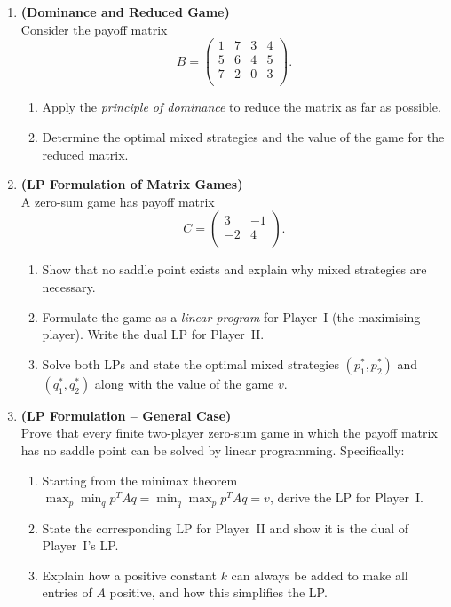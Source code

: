 \documentclass[12pt,a4paper]{article}
\begin{document}
\begin{enumerate}[leftmargin=*, label=\textbf{Q.\arabic*.}]
\item \textbf{(Dominance and Reduced Game)}\\
  Consider the payoff matrix
  \[
    B = \begin{pmatrix}
          1 & 7 & 3 & 4 \\
          5 & 6 & 4 & 5 \\
          7 & 2 & 0 & 3 \\
        \end{pmatrix}.
  \]
  \begin{enumerate}[label=(\alph*)]
    \item Apply the \textit{principle of dominance} to reduce the matrix as far
          as possible.
    \item Determine the optimal mixed strategies and the value of the game for
          the reduced matrix.
  \end{enumerate}

\item \textbf{(LP Formulation of Matrix Games)}\\
  A zero-sum game has payoff matrix
  \[
    C = \begin{pmatrix}
          3 & -1 \\
         -2 &  4 \\
        \end{pmatrix}.
  \]
  \begin{enumerate}[label=(\alph*)]
    \item Show that no saddle point exists and explain why mixed strategies are
          necessary.
    \item Formulate the game as a \textit{linear program} for Player~I
          (the maximising player).  Write the dual LP for Player~II.
    \item Solve both LPs and state the optimal mixed strategies
          $(p_1^*, p_2^*)$ and $(q_1^*, q_2^*)$ along with the value of the
          game $v$.
  \end{enumerate}

\item \textbf{(LP Formulation -- General Case)}\\
  Prove that every finite two-player zero-sum game in which the payoff matrix
  has no saddle point can be solved by linear programming.  Specifically:
  \begin{enumerate}[label=(\alph*)]
    \item Starting from the minimax theorem
          $\max_p \min_q p^T A q = \min_q \max_p p^T A q = v$,
          derive the LP for Player~I.
    \item State the corresponding LP for Player~II and show it is the dual of
          Player~I's LP.
    \item Explain how a positive constant $k$ can always be added to make all
          entries of $A$ positive, and how this simplifies the LP.
  \end{enumerate}


\end{enumerate}
\end{document}

